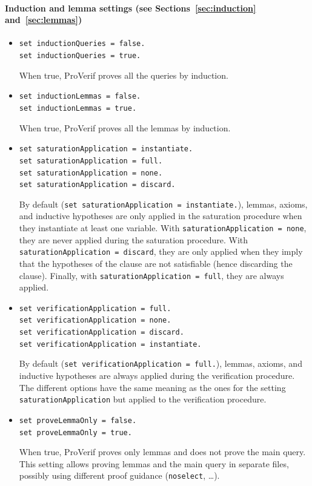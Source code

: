 \documentclass{book}
\begin{document}
\paragraph{Induction and lemma settings (see Sections~\ref{sec:induction} and~\ref{sec:lemmas})}

\begin{itemize}
\item \lstinline{set inductionQueries = false.}\\
\lstinline{set inductionQueries = true.}

When true, ProVerif proves all the queries by induction.

\item \lstinline{set inductionLemmas = false.}\\
\lstinline{set inductionLemmas = true.}

When true, ProVerif proves all the lemmas by induction.

\item \lstinline{set saturationApplication = instantiate.}\\
\lstinline{set saturationApplication = full.}\\
\lstinline{set saturationApplication = none.}\\
\lstinline{set saturationApplication = discard.}

By default (\lstinline{set saturationApplication = instantiate.}), lemmas, axioms, and inductive hypotheses are only applied in the saturation procedure when they instantiate at least one variable. With \lstinline{saturationApplication = none}, they are never applied during the saturation procedure. With \lstinline{saturationApplication = discard}, they are only applied when they imply that the hypotheses of the clause are not satisfiable (hence discarding the clause). Finally, with \lstinline{saturationApplication = full}, they are always applied.

\item \lstinline{set verificationApplication = full.}\\
\lstinline{set verificationApplication = none.}\\
\lstinline{set verificationApplication = discard.}\\
\lstinline{set verificationApplication = instantiate.}

By default (\lstinline{set verificationApplication = full.}), lemmas, axioms, and inductive hypotheses are always applied during the verification procedure. The different options have the same meaning as the ones for the setting \lstinline!saturationApplication! but applied to the verification procedure.

\item \lstinline{set proveLemmaOnly = false.}\\
\lstinline{set proveLemmaOnly = true.}

When true, ProVerif proves only lemmas and does not prove the main query.
This setting allows proving lemmas and the main query in separate files,
possibly using different proof guidance (\lstinline!noselect!, \ldots).

\end{itemize}
\end{document}
